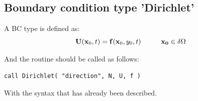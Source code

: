 
\subsection{Boundary condition type 'Dirichlet'}

A BC type  is defined as: 
$$
  		\mathbf U(\mathbf x_0, t)= \mathbf f(\mathbf x_0,y_0,t) \hspace{1cm} 
  		\mathbf{x_0} \in \delta \Omega \\
$$

And the routine should be called as follows: 

\begin{blueframed}
\begin{lstlisting}
call Dirichlet( "direction", N, U, f ) 
\end{lstlisting}
\end{blueframed}

With the syntax that has already been described. \\

